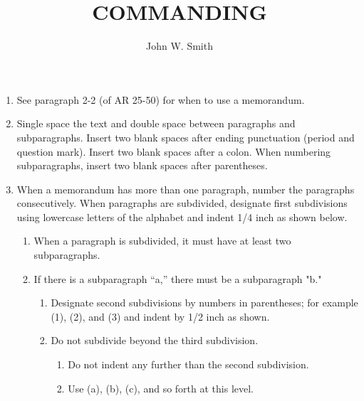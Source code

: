 \documentclass{../armymemo}
\author{John W. Smith}\rank{CPT}\branch{CY}
\title{COMMANDING}                                                %
\begin{document}
\begin{enumerate}
\item See paragraph 2-2 (of AR 25-50) for when to use a memorandum.
\item Single space the text and double space between paragraphs and subparagraphs. Insert two blank spaces after ending punctuation (period and question mark). Insert two blank spaces after a colon. When numbering subparagraphs, insert two blank spaces after parentheses.
\item When a memorandum has more than one paragraph, number the paragraphs consecutively. When paragraphs are subdivided, designate first subdivisions using lowercase letters of the alphabet and indent 1/4 inch as shown below.
  \begin{enumerate}
  \item When a paragraph is subdivided, it must have at least two subparagraphs.
  \item If there is a subparagraph ``a,'' there must be a subparagraph "b." %
    \begin{enumerate}
    \item Designate second subdivisions by numbers in parentheses; for example (1), (2), and (3) and indent by 1/2 inch as shown.
    \item Do not subdivide beyond the third subdivision.
      \begin{enumerate}
      \item Do not indent any further than the second subdivision.
      \item Use (a), (b), (c), and so forth at this level.
      \end{enumerate}
    \end{enumerate}
  \end{enumerate}
\end{enumerate}
\end{document}
